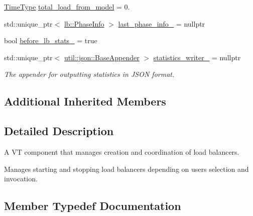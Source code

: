 \begin{DoxyCompactItemize}
\item 
\hyperlink{namespacevt_a876a9d0cd5a952859c72de8a46881442}{Time\+Type} \hyperlink{structvt_1_1vrt_1_1collection_1_1balance_1_1_l_b_manager_a7f6bcfd7992bcf0ec01dcb8ed5e0a789}{total\+\_\+load\+\_\+from\+\_\+model} = 0.
\item 
std\+::unique\+\_\+ptr$<$ \hyperlink{structvt_1_1vrt_1_1collection_1_1lb_1_1_phase_info}{lb\+::\+Phase\+Info} $>$ \hyperlink{structvt_1_1vrt_1_1collection_1_1balance_1_1_l_b_manager_ac079e6cb56fedab15d6a776f89cb8e44}{last\+\_\+phase\+\_\+info\+\_\+} = nullptr
\item 
bool \hyperlink{structvt_1_1vrt_1_1collection_1_1balance_1_1_l_b_manager_ad5f6e3a90a443d75ad9df0264d3e9d83}{before\+\_\+lb\+\_\+stats\+\_\+} = true
\item 
std\+::unique\+\_\+ptr$<$ \hyperlink{structvt_1_1util_1_1json_1_1_base_appender}{util\+::json\+::\+Base\+Appender} $>$ \hyperlink{structvt_1_1vrt_1_1collection_1_1balance_1_1_l_b_manager_a6a5c0370df20ab5adb200fb766b03776}{statistics\+\_\+writer\+\_\+} = nullptr
\begin{DoxyCompactList}\small\item\em The appender for outputting statistics in J\+S\+ON format. \end{DoxyCompactList}\end{DoxyCompactItemize}
\subsection*{Additional Inherited Members}


\subsection{Detailed Description}
A VT component that manages creation and coordination of load balancers. 

Manages starting and stopping load balancers depending on user\textquotesingle{}s selection and invocation. 

\subsection{Member Typedef Documentation}
\mbox{\label{structvt_1_1vrt_1_1collection_1_1balance_1_1_l_b_manager_a8b1a7735366beb85c2c2ccc3912cdd80}} 
